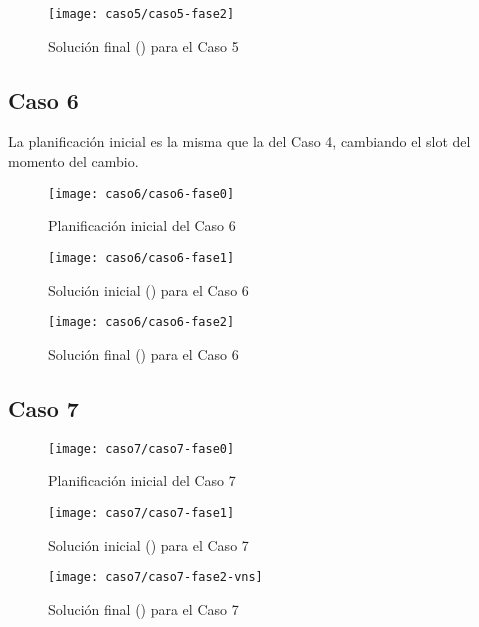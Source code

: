 \begin{figure}[!h]
	\centering
	\texttt{[image: caso5/caso5-fase2]}
	\caption{Solución final (\fasedos{}) para el Caso 5}
	\label{fig:caso5-fase2}
\end{figure}

\FloatBarrier
\newpage
\subsection{Caso 6}

La planificación inicial es la misma que la del Caso 4, cambiando el slot del momento del cambio.

\begin{figure}[!h]
	\centering
	\texttt{[image: caso6/caso6-fase0]}
	\caption{Planificación inicial del Caso 6}
	\label{fig:caso6-fase0}
\end{figure}

\begin{figure}[!h]
	\centering
	\texttt{[image: caso6/caso6-fase1]}
	\caption{Solución inicial (\faseuno{}) para el Caso 6}
	\label{fig:caso6-fase1}
\end{figure}

\begin{figure}[!h]
	\centering
	\texttt{[image: caso6/caso6-fase2]}
	\caption{Solución final (\fasedos{}) para el Caso 6}
	\label{fig:caso6-fase2}
\end{figure}

\FloatBarrier
\newpage
\subsection{Caso 7}

\begin{figure}[!h]
	\centering
	\texttt{[image: caso7/caso7-fase0]}
	\caption{Planificación inicial del Caso 7}
	\label{fig:caso7-fase0}
\end{figure}

\begin{figure}[!h]
	\centering
	\texttt{[image: caso7/caso7-fase1]}
	\caption{Solución inicial (\faseuno{}) para el Caso 7}
	\label{fig:caso7-fase1}
\end{figure}

\begin{figure}[!h]
	\centering
	\texttt{[image: caso7/caso7-fase2-vns]}
	\caption{Solución final (\fasedos{}) para el Caso 7}
	\label{fig:caso7-fase2}
\end{figure}

